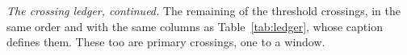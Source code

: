 \begin{table}
\centering
\caption{\emph{The crossing ledger, continued.} The remaining
\CxLedgerPartTwo{} of the \EvNCrossRaw{} threshold crossings, in the same
order and with the same columns as Table~\ref{tab:ledger}, whose caption
defines them. These too are primary crossings, one to a window.}
\label{tab:ledgercont}
\tiny

\end{table}
